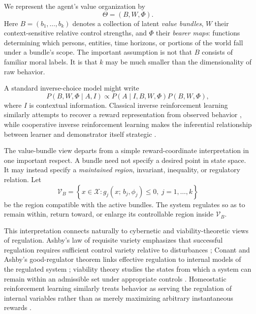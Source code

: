 \documentclass[11pt]{article}
\newcommand{\V}{\mathcal{V}}
\begin{document}
We represent the agent's value organization by
\[
    \Theta=(B,W,\Phi).
\]
Here $B=(b_1,\ldots,b_k)$ denotes a collection of latent \emph{value bundles}, $W$ their context-sensitive relative control strengths, and $\Phi$ their \emph{bearer maps}: functions determining which persons, entities, time horizons, or portions of the world fall under a bundle's scope. The important assumption is not that $B$ consists of familiar moral labels. It is that $k$ may be much smaller than the dimensionality of raw behavior.

A standard inverse-choice model might write
\begin{equation}
 P(B,W,\Phi\mid A,I)
 \propto
 P(A\mid I,B,W,\Phi)P(B,W,\Phi),
 \label{eq:basicinverse}
\end{equation}
where $I$ is contextual information. Classical inverse reinforcement learning similarly attempts to recover a reward representation from observed behavior \citep{NgRussell2000}, while cooperative inverse reinforcement learning makes the inferential relationship between learner and demonstrator itself strategic \citep{HadfieldMenell2016}.

The value-bundle view departs from a simple reward-coordinate interpretation in one important respect. A bundle need not specify a desired point in state space. It may instead specify a \emph{maintained region}, invariant, inequality, or regulatory relation. Let
\begin{equation}
    \V_B
    =
    \left\{
       x\in\mathcal{X}:
       g_j(x;\,b_j,\phi_j)\leq 0,\;
       j=1,\ldots,k
    \right\}
    \label{eq:viableset}
\end{equation}
be the region compatible with the active bundles. The system regulates so as to remain within, return toward, or enlarge its controllable region inside $\V_B$.

This interpretation connects naturally to cybernetic and viability-theoretic views of regulation. Ashby's law of requisite variety emphasizes that successful regulation requires sufficient control variety relative to disturbances \citep{Ashby1956}; Conant and Ashby's good-regulator theorem links effective regulation to internal models of the regulated system \citep{ConantAshby1970}; viability theory studies the states from which a system can remain within an admissible set under appropriate controls \citep{Aubin1991}. Homeostatic reinforcement learning similarly treats behavior as serving the regulation of internal variables rather than as merely maximizing arbitrary instantaneous rewards \citep{KeramatiGutkin2014}.
\end{document}
